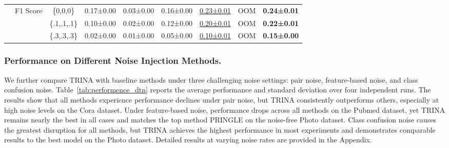 \documentclass[sigconf, anonymous, review]{acmart}
\begin{document}
\begin{table}
{\begin{tabular}{ccccccccc}
            &\multirow{3}{*}{F1 Score}&\{0,0,0\}&0.17±0.00&0.03±0.00&0.16±0.00&\underline{0.23±0.01}&OOM&\textbf{0.24±0.01} \\
            &&\{.1,.1,.1\}&0.10±0.00&0.02±0.00&0.12±0.00&\underline{0.20±0.01}&OOM&\textbf{0.22±0.01} \\
            &&\{.3,.3,.3\}&0.02±0.00&0.01±0.00&0.05±0.00&\underline{0.10±0.01}&OOM&\textbf{0.15±0.00}\\

          \bottomrule
        \end{tabular}}
        \label{tab:performence_uniform}
      \end{table}

    \subsubsection{Performance on Different Noise Injection Methods.} 
      We further compare TRINA with baseline methods under three challenging noise settings: pair noise, feature-based noise, and class confusion noise. Table~\ref{tab:performence_dtn} reports the average performance and standard deviation over four independent runs. The results show that all methods experience performance declines under pair noise, but TRINA consistently outperforms others, especially at high noise levels on the Cora dataset. Under feature-based noise, performance drops across all methods on the Pubmed dataset, yet TRINA remains nearly the best in all cases and matches the top method PRINGLE on the noise-free Photo dataset. Class confusion noise causes the greatest disruption for all methods, but TRINA achieves the highest performance in most experiments and demonstrates comparable results to the best model on the Photo dataset. Detailed results at varying noise rates are provided in the Appendix.
\end{document}
